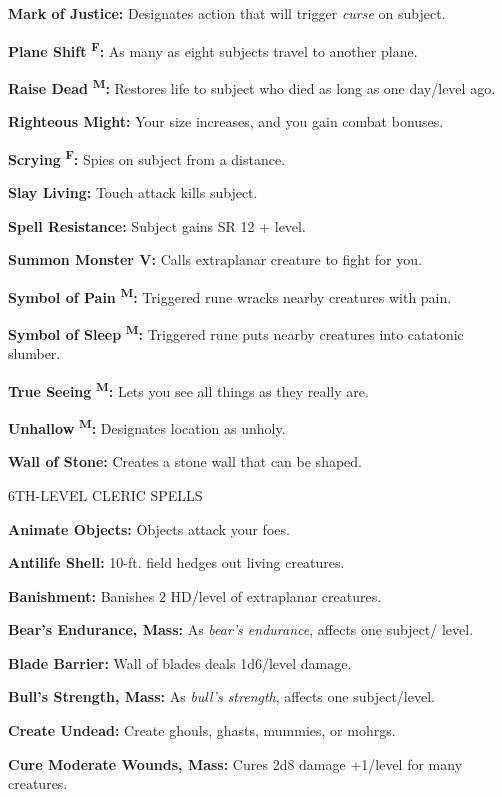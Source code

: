 \documentclass{article}
\begin{document}
\textbf{Mark of Justice:} Designates action that will trigger \textit{curse }on 
subject.

\textbf{Plane Shift }\textsuperscript{\textbf{F}}\textbf{:} As many as eight subjects 
travel to another plane.

\textbf{Raise Dead }\textsuperscript{\textbf{M}}\textbf{:} Restores life to subject 
who died as long as one day/level ago.

\textbf{Righteous Might:} Your size increases, and you gain combat bonuses.

\textbf{Scrying }\textsuperscript{\textbf{F}}\textbf{:} Spies on subject from a 
distance.

\textbf{Slay Living:} Touch attack kills subject.

\textbf{Spell Resistance:} Subject gains SR 12 + level.

\textbf{Summon Monster V:} Calls extraplanar creature to fight for you.

\textbf{Symbol of Pain }\textsuperscript{\textbf{M}}\textbf{:} Triggered rune wracks 
nearby creatures with pain.

\textbf{Symbol of Sleep }\textsuperscript{\textbf{M}}\textbf{:} Triggered rune 
puts nearby creatures into catatonic slumber.

\textbf{True Seeing }\textsuperscript{\textbf{M}}\textbf{:} Lets you see all things 
as they really are.

\textbf{Unhallow }\textsuperscript{\textbf{M}}\textbf{:} Designates location as 
unholy.

\textbf{Wall of Stone:} Creates a stone wall that can be shaped.

6TH-LEVEL CLERIC SPELLS

\textbf{Animate Objects:} Objects attack your foes.

\textbf{Antilife Shell:} 10-ft. field hedges out living creatures.

\textbf{Banishment:} Banishes 2 HD/level of extraplanar creatures.

\textbf{Bear's Endurance, Mass:} As \textit{bear's endurance}, affects one subject/ 
level.

\textbf{Blade Barrier: }Wall of blades deals 1d6/level damage.

\textbf{Bull's Strength, Mass:} As \textit{bull's strength}, affects one subject/level.

\textbf{Create Undead:} Create ghouls, ghasts, mummies, or mohrgs.

\textbf{Cure Moderate Wounds, Mass:} Cures 2d8 damage +1/level for many creatures.
\end{document}
